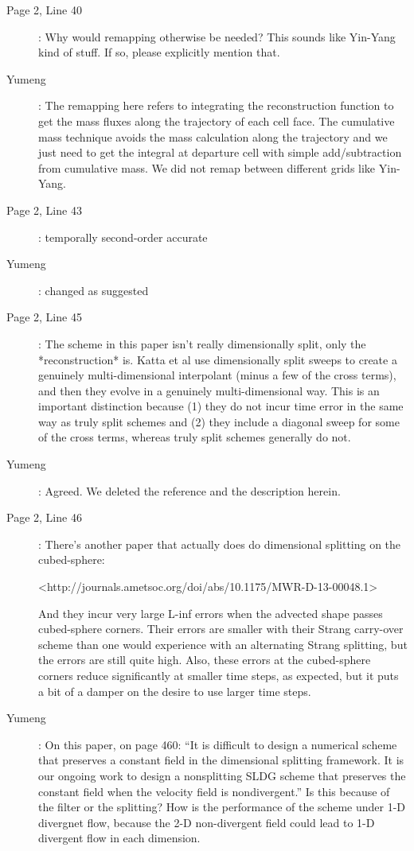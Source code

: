 \documentclass[12pt,a4paper]{article}
\begin{document}
\begin{description}
\item [Page 2, Line 40]: Why would remapping otherwise be needed? This sounds like Yin-Yang kind of stuff. If so, please explicitly mention that.

\item [Yumeng]:  The remapping here refers to integrating the reconstruction function to get the mass fluxes along the trajectory of each cell face. The cumulative mass technique \citep{CW84,LLM95} avoids the mass calculation along the trajectory and we just need to get the integral at departure cell with simple add/subtraction from cumulative mass. We did not remap between different grids like Yin-Yang.

\item [Page 2, Line 43]: temporally second-order accurate

\item [Yumeng]: changed as suggested

\item [Page 2, Line 45]: The scheme in this paper isn't really dimensionally split, only the *reconstruction* is. Katta et al use dimensionally split sweeps to create a genuinely multi-dimensional interpolant (minus a few of the cross terms), and then they evolve in a genuinely multi-dimensional way. This is an important distinction because (1) they do not incur time error in the same way as truly split schemes and (2) they include a diagonal sweep for some of the cross terms, whereas truly split schemes generally do not.

\item [Yumeng]: Agreed. We deleted the reference and the description herein.


\item [Page 2, Line 46]: There's another paper that actually does do dimensional splitting on the cubed-sphere:

<http://journals.ametsoc.org/doi/abs/10.1175/MWR-D-13-00048.1>

And they incur very large L-inf errors when the advected shape passes cubed-sphere corners. Their errors are smaller with their Strang carry-over scheme than one would experience with an alternating Strang splitting, but the errors are still quite high. Also, these errors at the cubed-sphere corners reduce significantly at smaller time steps, as expected, but it puts a bit of a damper on the desire to use larger time steps.

\item [Yumeng]: 
On this paper, on page 460: 
``It is difficult to design a numerical scheme that preserves a constant field in the dimensional splitting framework. It is our ongoing work to design a nonsplitting SLDG scheme that preserves the constant field when the velocity field is nondivergent.'' 
Is this because of the filter or the splitting? How is the performance of the scheme under 1-D divergnet flow, because the 2-D non-divergent field could lead to 1-D divergent flow in each dimension.


\end{description}
\end{document}

